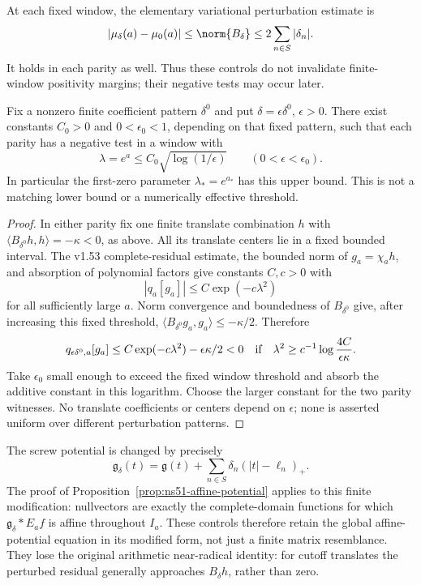At each fixed window, the elementary variational perturbation estimate is
\[
 |\mu_\delta(a)-\mu_0(a)|\le\norm{B_\delta}
                    \le2\sum_{n\in S}|\delta_n|.
\]
It holds in each parity as well. Thus these controls do not invalidate
finite-window positivity margins; their negative tests may occur later.

\begin{corollary}\label{cor:ns57-fixed-direction-sensitivity}
Fix a nonzero finite coefficient pattern $\delta^0$ and put
$\delta=\epsilon\delta^0$, $\epsilon>0$. There exist constants
$C_0>0$ and $0<\epsilon_0<1$, depending on that fixed pattern, such
that each parity has a negative test in a window with
\[
 \lambda=e^a\le C_0\sqrt{\log(1/\epsilon)}
       \qquad(0<\epsilon<\epsilon_0).
\]
In particular the first-zero parameter $\lambda_*=e^{a_*}$ has this upper bound.
This is not a matching lower bound or a numerically effective threshold.
\end{corollary}
\begin{proof}
In either parity fix one finite translate combination $h$ with
$\langle B_{\delta^0}h,h\rangle=-\kappa<0$, as above.
All its translate centers lie in a fixed bounded interval. The
v1.53 complete-residual estimate, the bounded norm of $g_a=\chi_a h$,
and absorption of polynomial factors give constants $C,c>0$ with
\[
 |q_a[g_a]|\le C\exp(-c\lambda^2)
\]
for all sufficiently large $a$. Norm convergence and boundedness of
$B_{\delta^0}$ give, after increasing this fixed threshold,
$\langle B_{\delta^0}g_a,g_a\rangle\le-\kappa/2$.
Therefore
\[
 q_{\epsilon\delta^0,a}[g_a]
 \le C\exp(-c\lambda^2)-\epsilon\kappa/2<0
 \quad\hbox{if}\quad
 \lambda^2\ge c^{-1}\log\frac{4C}{\epsilon\kappa}.
\]
Take $\epsilon_0$ small enough to exceed the fixed window threshold
and absorb the additive constant in this logarithm. Choose the larger
constant for the two parity witnesses. No translate coefficients or
centers depend on $\epsilon$; none is asserted uniform over different
perturbation patterns.
\end{proof}

The screw potential is changed by precisely
\[
 \mathfrak g_\delta(t)=\mathfrak g(t)+
                 \sum_{n\in S}\delta_n(|t|-\ell_n)_+.
\]
The proof of Proposition~\ref{prop:ns51-affine-potential} applies to this finite modification:
nullvectors are exactly the complete-domain functions for which
$\mathfrak g_\delta*E_af$ is affine throughout $I_a$.
These controls therefore retain the global affine-potential equation
in its modified form, not just a finite matrix resemblance.
They lose the original arithmetic near-radical identity:
for cutoff translates the perturbed residual generally approaches
$B_\delta h$, rather than zero.

